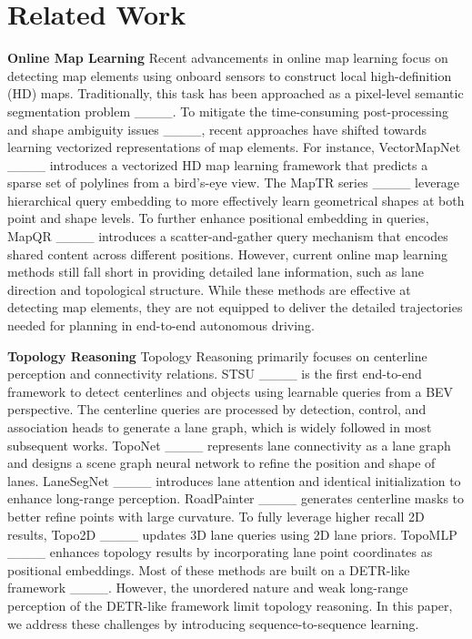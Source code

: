 \section{Related Work}
\textbf{Online Map Learning}
Recent advancements in online map learning focus on detecting map elements using onboard sensors to construct local high-definition (HD) maps. Traditionally, this task has been approached as a pixel-level semantic segmentation problem ____. To mitigate the time-consuming post-processing and shape ambiguity issues ____, recent approaches have shifted towards learning vectorized representations of map elements. For instance, VectorMapNet ____ introduces a vectorized HD map learning framework that predicts a sparse set of polylines from a bird's-eye view. The MapTR series ____ leverage hierarchical query embedding to more effectively learn geometrical shapes at both point and shape levels. To further enhance positional embedding in queries, MapQR ____ introduces a scatter-and-gather query mechanism that encodes shared content across different positions. However, current online map learning methods still fall short in providing detailed lane information, such as lane direction and topological structure. While these methods are effective at detecting map elements, they are not equipped to deliver the detailed trajectories needed for planning in end-to-end autonomous driving.



\textbf{Topology Reasoning}
Topology Reasoning primarily focuses on centerline perception and connectivity relations. STSU ____ is the first end-to-end framework to detect centerlines and objects using learnable queries from a BEV perspective. The centerline queries are processed by detection, control, and association heads to generate a lane graph, which is widely followed in most subsequent works. TopoNet ____ represents lane connectivity as a lane graph and designs a scene graph neural network to refine the position and shape of lanes. LaneSegNet ____ introduces lane attention and identical initialization to enhance long-range perception. RoadPainter ____ generates centerline masks to better refine points with large curvature. To fully leverage higher recall 2D results, Topo2D ____ updates 3D lane queries using 2D lane priors. TopoMLP ____ enhances topology results by incorporating lane point coordinates as positional embeddings. Most of these methods are built on a DETR-like framework ____. However, the unordered nature and weak long-range perception of the DETR-like framework limit topology reasoning. In this paper, we address these challenges by introducing sequence-to-sequence learning.



